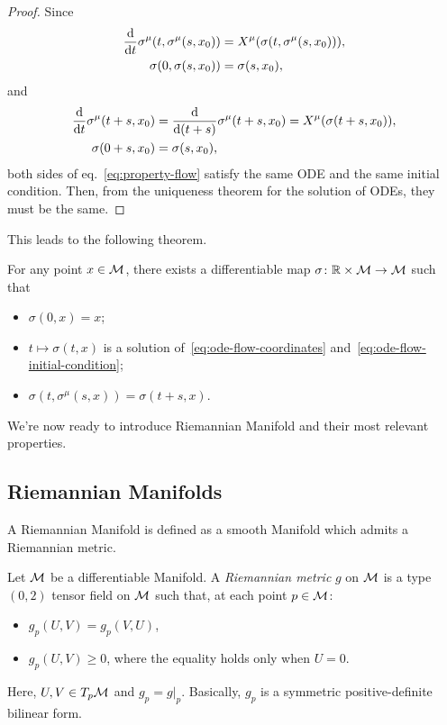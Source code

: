 \begin{proof}
    Since
    \begin{align*}
        \frac{\mathop{}\!\mathrm{d}}{\mathop{}\!\mathrm{d} t} \sigma^\mu (t, \sigma^\mu(s,x_0)) &= X^\mu (\sigma(t, \sigma^\mu(s,x_0))), \\
        \sigma(0,\sigma(s,x_0)) &= \sigma(s,x_0),
    \end{align*}
    and
    \begin{align*}
        \frac{\mathop{}\!\mathrm{d}}{\mathop{}\!\mathrm{d} t} \sigma^\mu (t+s,x_0) &= \frac{\mathop{}\!\mathrm{d}}{\mathop{}\!\mathrm{d}(t+s)} \sigma^\mu(t+s,x_0) = X^\mu(\sigma(t+s,x_0)), \\
        \sigma(0+s,x_0) &= \sigma(s,x_0),
    \end{align*}
    both sides of eq.~\eqref{eq:property-flow} satisfy the same ODE and the same initial condition. Then, from the uniqueness theorem for the solution of ODEs, they must be the same.
\end{proof}

This leads to the following theorem.
\begin{theorem}
    For any point $x \in \mathcal{M}$, there exists a differentiable map $\sigma \colon \mathbb{R} \times \mathcal{M} \to \mathcal{M}$ such that
    \begin{itemize}
        \item $\sigma(0,x) = x$;
        \item $t \mapsto \sigma(t,x)$ is a solution of~\eqref{eq:ode-flow-coordinates} and~\eqref{eq:ode-flow-initial-condition};
        \item $\sigma(t,\sigma^\mu(s,x)) = \sigma(t+s,x)$.
    \end{itemize}
\end{theorem}

We're now ready to introduce Riemannian Manifold and their most relevant properties.

\subsection{Riemannian Manifolds}
A Riemannian Manifold is defined as a smooth Manifold which admits a Riemannian metric.

\begin{definition}
    Let $\mathcal{M}$ be a differentiable Manifold. A \emph{Riemannian metric} $g$ on $\mathcal{M}$ is a type $(0,2)$ tensor field on $\mathcal{M}$ such that, at each point $p \in \mathcal{M}$:
    \begin{itemize}
        \item $g_p (U,V) = g_p (V,U)$,
        \item $g_p(U,V) \geq 0$, where the equality holds only when $U=0$.
    \end{itemize}
    Here, $U,V \in T_p \mathcal{M}$ and $g_p = g|_p$. Basically, $g_p$ is a symmetric positive-definite bilinear form.
\end{definition}

